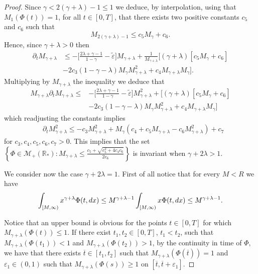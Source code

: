 \documentclass[10pt,a4paper]{amsart}
\newcommand{\der}{\textup{d}}
\begin{document}
\begin{proof}
Since $\gamma < 2(\gamma +\lambda ) -1 \leq 1 $ we deduce, by interpolation, using that $M_{1}(\Phi(t))=1$, for all $t\in[0,T]$, that there exists two positive constants $c_5$ and $c_6$ such that 
\[
M_{ 2(\gamma +\lambda ) -1 } \leq c_5 M_\gamma  + c_6. 
\]
Hence, since $\gamma + \lambda >0$ then 
\begin{align*}
\partial_{t} M_{\gamma +\lambda}& \leq- \big[\frac{2\lambda + \gamma -1 }{1-\gamma}-\tilde{\varepsilon}\big] M_{\gamma+\lambda}
+ \frac{1}{M_{\gamma+\lambda}} [ (\gamma +\lambda) \left[ c_5 M_\gamma  + c_6 \right]\\
&- 2c_3 \left(1-\gamma-\lambda \right)
 M_{\gamma } M_{\gamma+ \lambda}^2 +c_{4}M_{\gamma+\lambda}M_{\gamma}].
\end{align*}
Multiplying by $M_{\gamma +\lambda}$ the inequality we deduce that 
\begin{align*}
  M_{\gamma +\lambda}  \partial_{t} M_{\gamma +\lambda} \leq&- \big[\frac{2\lambda + \gamma -1 }{1-\gamma}-\tilde{\varepsilon}\big] M_{\gamma+\lambda}^2
+  [ (\gamma +\lambda) \left[ c_5 M_\gamma  + c_6 \right]\\
&- 2c_3 \left(1-\gamma-\lambda \right)
 M_{\gamma } M_{\gamma+ \lambda}^2+c_{4}M_{\gamma+\lambda}M_{\gamma}]
\end{align*}
which readjusting the constants implies 
\begin{align}\label{constant gamma lambda larger one}
&  \partial_{t} M_{\gamma +\lambda}^2 \leq- c_3 M_{\gamma+\lambda}^2
+  M_\gamma \left( c_4 +c_{5}M_{\gamma+\lambda}  - c_6 M_{\gamma+ \lambda}^2 \right) + c_7
\end{align}
for $c_3, c_4, c_5, c_6,c_{7}>0.$
This implies that the set $\left\{ \Phi \in \mathcal M_{+}(\mathbb R_*) : M_{\gamma +\lambda } \leq  \frac{ c_5+\sqrt{c_5^{2}+4c_{4}c_{6}}}{2 c_{6} } \right\} $ is invariant when $\gamma + 2 \lambda >1.$

We consider now the case $\gamma + 2 \lambda =1.$ 
First of all notice that for every $M < R $ we have 
\[
\int_{[M, \infty ) } x^{\gamma + \lambda} \Phi(t, \der x) \leq M^{\gamma+\lambda -1 } \int_{[M , \infty )} x \Phi(t, \der x ) \leq M^{\gamma + \lambda -1}.
\] 

Notice that an upper bound is obvious for the points $t\in[0,T]$ for which $M_{\gamma+\lambda}(\Phi(t))\leq 1$. 
If there exist $t_{1},t_{2}\in[0,T]$, $t_{1}<t_{2}$, such that  $M_{\gamma+\lambda}(\Phi(t_{1}))<1$ and $M_{\gamma+\lambda}(\Phi(t_{2}))>1$, by the continuity in time of $\Phi,$ we have that there exists $\overline{t}\in[t_{1},t_{2}]$ such that $M_{\gamma+\lambda}(\Phi(\overline{t}))=1$ and $\varepsilon_{1}\in(0,1)$ such that $M_{\gamma+\lambda}(\Phi(s))\geq 1$ on $[\overline{t},\overline{t}+\varepsilon_{1}]$.


\end{proof}
\end{document}

